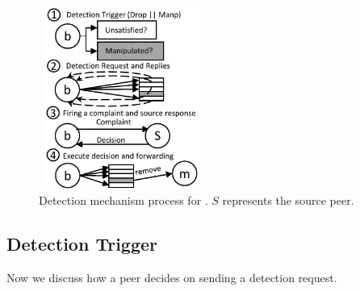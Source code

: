 \begin{figure}
 \centering
 \includegraphics[width=5.5cm,height=6cm]{./Figures/detection.pdf}
  \caption{Detection mechanism process for \drop. $S$ represents the source peer.}
\label{detection-blocks} 
\end{figure}

\subsection{Detection Trigger}
\label{Detection-Trigger}
 Now we discuss how a peer decides on sending a detection request.
% 

